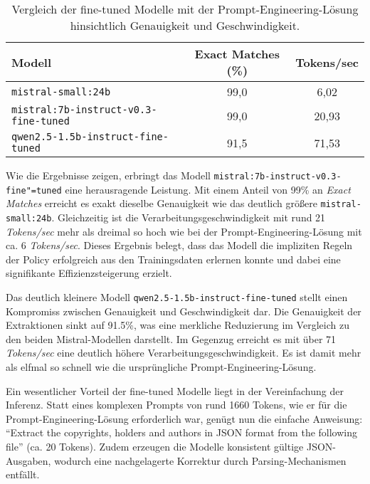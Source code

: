\begin{table}[H]
    \centering
    \begin{tabular}{l c c}
        \hline
        \textbf{Modell} & \textbf{Exact Matches (\%)} & \textbf{Tokens/sec} \\
        \hline
        \texttt{mistral-small:24b} & 99,0 & 6,02 \\
        \texttt{mistral:7b-instruct-v0.3-fine-tuned} & 99,0 & 20,93 \\
        \texttt{qwen2.5-1.5b-instruct-fine-tuned} & 91,5 & 71,53 \\
        \hline
    \end{tabular}
    \caption{Vergleich der fine-tuned Modelle mit der Prompt-Engineering-Lösung hinsichtlich Genauigkeit und Geschwindigkeit.}
    \label{tab:modellvergleich}
\end{table}

Wie die Ergebnisse zeigen, erbringt das Modell \texttt{mistral:7b-instruct-v0.3-fine"=tuned} eine herausragende Leistung.
Mit einem Anteil von \num{99}\% an \textit{Exact Matches} erreicht es exakt dieselbe Genauigkeit wie das deutlich größere \texttt{mistral-small:24b}.
Gleichzeitig ist die Verarbeitungsgeschwindigkeit mit rund \num{21} \textit{Tokens/sec} mehr als dreimal so hoch wie bei der Prompt-Engineering-Lösung mit ca. \num{6} \textit{Tokens/sec}.
Dieses Ergebnis belegt, dass das Modell die impliziten Regeln der Policy erfolgreich aus den Trainingsdaten erlernen konnte und dabei eine signifikante Effizienzsteigerung erzielt.

Das deutlich kleinere Modell \texttt{qwen2.5-1.5b-instruct-fine-tuned} stellt einen Kompromiss zwischen Genauigkeit und Geschwindigkeit dar.
Die Genauigkeit der Extraktionen sinkt auf \num{91,5}\%, was eine merkliche Reduzierung im Vergleich zu den beiden Mistral-Modellen darstellt.
Im Gegenzug erreicht es mit über \num{71} \textit{Tokens/sec} eine deutlich höhere Verarbeitungsgeschwindigkeit.
Es ist damit mehr als elfmal so schnell wie die ursprüngliche Prompt-Engineering-Lösung.

Ein wesentlicher Vorteil der fine-tuned Modelle liegt in der Vereinfachung der Inferenz.
Statt eines komplexen Prompts von rund 1660 Tokens, wie er für die Prompt-Engineering-Lösung erforderlich war, genügt nun die einfache Anweisung: \enquote{Extract the copyrights, holders and authors in JSON format from the following file} (ca. 20 Tokens).
Zudem erzeugen die Modelle konsistent gültige JSON-Ausgaben, wodurch eine nachgelagerte Korrektur durch Parsing-Mechanismen entfällt.

